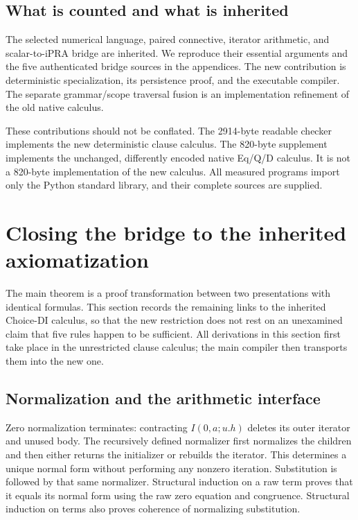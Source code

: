 \documentclass[11pt,letterpaper]{article}
\theoremstyle{definition}
\begin{document}
\subsection{What is counted and what is inherited}

The selected numerical language, paired connective, iterator arithmetic,
and scalar-to-iPRA bridge are inherited. We reproduce their essential
arguments and the five authenticated bridge sources in the appendices.
The new contribution is deterministic specialization, its persistence
proof, and the executable compiler. The separate grammar/scope traversal
fusion is an implementation refinement of the old native calculus.

These contributions should not be conflated. The 2914-byte readable
checker implements the new deterministic clause calculus. The 820-byte
supplement implements the unchanged, differently encoded native Eq/Q/D
calculus. It is not a 820-byte implementation of the new calculus.
All measured programs import only the Python standard library, and
their complete sources are supplied.


\section{Closing the bridge to the inherited axiomatization}
\label{sec:closing-bridge}

The main theorem is a proof transformation between two presentations
with identical formulas. This section records the remaining links to
the inherited Choice-DI calculus, so that the new restriction does not
rest on an unexamined claim that five rules happen to be sufficient.
All derivations in this section first take place in the unrestricted
clause calculus; the main compiler then transports them into the new one.

\subsection{Normalization and the arithmetic interface}

Zero normalization terminates: contracting \(I(0,a;u.h)\) deletes its
outer iterator and unused body. The recursively defined normalizer
first normalizes the children and then either returns the initializer
or rebuilds the iterator. This determines a unique normal form without
performing any nonzero iteration. Substitution is followed by that same
normalizer. Structural induction on a raw term proves that it equals
its normal form using the raw zero equation and congruence. Structural
induction on terms also proves coherence of normalizing substitution.
\end{document}
